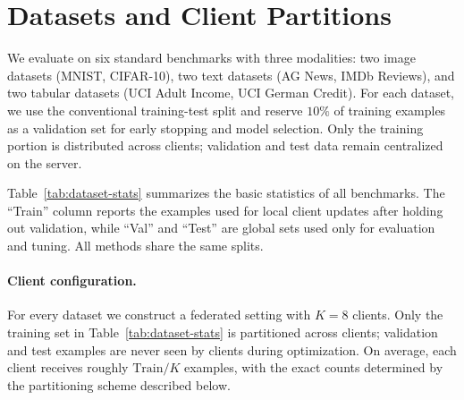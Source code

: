 \documentclass{article}
\theoremstyle{plain}
\theoremstyle{definition}
\theoremstyle{remark}
\begin{document}
\section{Datasets and Client Partitions}
\label{app:data-partitions}

We evaluate on six standard benchmarks with three modalities: two image datasets (MNIST, CIFAR-10), two text datasets (AG News, IMDb Reviews), and two tabular datasets (UCI Adult Income, UCI German Credit). For each dataset, we use the conventional training-test split and reserve $10\%$ of training examples as a validation set for early stopping and model selection. Only the training portion is distributed across clients; validation and test data remain centralized on the server.

Table~\ref{tab:dataset-stats} summarizes the basic statistics of all benchmarks. The ``Train'' column reports the examples used for local client updates after holding out validation, while ``Val'' and ``Test'' are global sets used only for evaluation and tuning. All methods share the same splits.

\begin{table}[h]
\centering
\small
\caption{Dataset statistics. Train and Val are derived from the standard training split by reserving $10\%$ of training examples for validation.}
\label{tab:dataset-stats}
\end{table}


\paragraph{Client configuration.}
For every dataset we construct a federated setting with $K{=}8$ clients. Only the training set in Table~\ref{tab:dataset-stats} is partitioned across clients; validation and test examples are never seen by clients during optimization. On average, each client receives roughly $\text{Train} / K$ examples, with the exact counts determined by the partitioning scheme described below.
\end{document}
